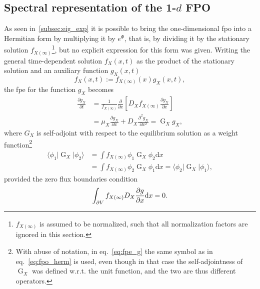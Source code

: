 \documentclass[a4paper,12pt]{book}
\begin{document}
\subsection{Spectral representation of the 1-$d$ FPO}

As seen in~\autoref{subsec:eig_exp} it is possible to bring the one-dimensional \acrshort{fpo} into a Hermitian form by multiplying it by $e^{\Phi}$, that is, by dividing it by the stationary solution $f_{X(\infty)}$\footnote{$f_{X(\infty)}$ is assumed to be normalized, such that all normalization factors are ignored in this section.}, but no explicit expression for this form was given. Writing the general time-dependent solution $f_{X}(x,t)$ as the product of the stationary solution and an auxiliary function $g_X(x,t)$
\begin{equation}
    f_{X}(x,t) := f_{X(\infty)}(x)g_{X}(x,t),
\end{equation}
the \acrshort{fpe} for the function $g_X$ becomes 
\begin{equation}
\label{eq:fpe_g}
    \begin{aligned}
\frac{\partial g_X}{\partial t} & =\frac{1}{f_{X(\infty)}} \frac{\partial}{\partial x}\left[D_X f_{X(\infty)} \frac{\partial g_X}{\partial x}\right]  \\
& =\mu_X \frac{\partial g_X}{\partial x}+D_X \frac{\partial^2 g_X}{\partial x^2}  =\operatorname{G}_Xg_X,
\end{aligned}
\end{equation}
where $G_X$ is self-adjoint with respect to the equilibrium solution as a weight function\footnote{With abuse of notation, in eq.~\eqref{eq:fpe_g} the same symbol as in eq.~\eqref{eq:fpo_herm} is used, even though in that case the self-adjointness of $\operatorname{G}_X$ was defined w.r.t. the unit function, and the two are thus different operators.}
\begin{equation}
\begin{aligned}
        \langle \phi_1 |\operatorname{G}_X | \phi_2 \rangle &= \int f_{X(\infty)}  \phi_1  \operatorname{G}_X  \phi_2 \mathrm{d}x \\
        &=\int f_{X(\infty)}  \phi_2  \operatorname{G}_X  \phi_1 \mathrm{d}x= \langle \phi_2 |\operatorname{G}_X | \phi_1 \rangle,  
\end{aligned}
\end{equation}
provided the zero flux boundaries condition
\begin{equation}
    \int_{\partial V} f_{X(\infty)}  D_X  \pdv{g}{x} \mathrm{d}x =0.
\end{equation}
\end{document}
